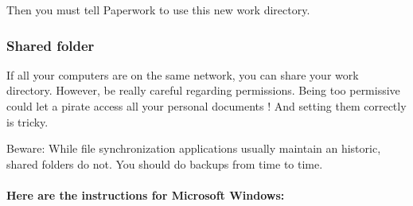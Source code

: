 \documentclass[10pt,a4paper]{article}
\begin{document}
Then you must tell Paperwork to use this new work directory.

\subsubsection{Shared folder}

If all your computers are on the same network, you can share your
work directory. However, be really careful regarding permissions.
Being too permissive could let a pirate access all your personal documents
! And setting them correctly is tricky.

Beware: While file synchronization applications usually maintain an
historic, shared folders do not. You should do backups from time to
time.

\paragraph{Here are the instructions for Microsoft Windows:}

%
%
%
%
%
%
%
%
\end{document}

